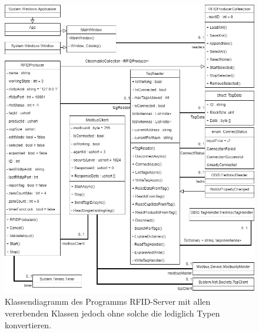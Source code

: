     \begin{figure}[ht]
        \label{fig:figure8}
        \includegraphics[width = \textwidth ]{Bilder/RFID_Klassendiagramm}
        \caption[Klassendiagramm des Programms RFID-Server ]
        {\small Klassendiagramm des Programms RFID-Server mit allen vererbenden Klassen jedoch ohne solche die
        lediglich Typen konvertieren.}
        \centering
    \end{figure}


